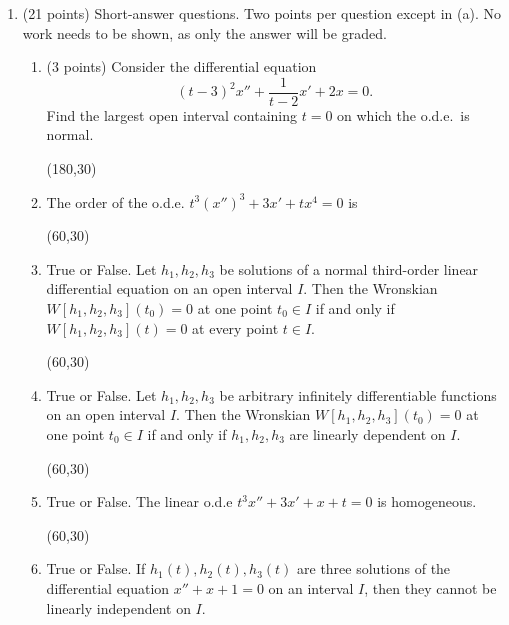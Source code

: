 \documentclass[12pt]{article}
\begin{document}
\begin{enumerate}
 \setlength{\itemsep}{5mm}


\item (21 points) Short-answer questions.  Two points per question
  except in (a).  No work needs to be shown, as only the answer will be graded.

  \begin{enumerate}
    \setlength{\itemsep}{5mm}


    \item (3 points) Consider the differential equation
      \[
        (t-3)^2 x'' + \frac{1}{t-2} x' + 2x = 0.
        \]
        Find the largest open interval containing $t=0$ on which the
        o.d.e.\ is normal.
        
        \hfill \framebox(180,30){}

         \item The order of the o.d.e. $t^3 (x'')^3 + 3x' +tx^4 = 0$ is

      \hfill \framebox(60,30){}


        \item  True or False.  Let $h_1, h_2, h_3$ be solutions of a normal
          third-order linear differential equation on an open
      interval $I$.  Then the Wronskian $W[h_1, h_2, h_3](t_0) = 0$
      at one point $t_0 \in I$ if and only if $W[h_1, h_2, h_3](t)
      =0$ at every point $t \in I$.

      \hfill \framebox(60,30){}

      \item True or False.  Let $h_1, h_2, h_3$ be arbitrary infinitely differentiable
        functions on an open interval $I$.  Then the Wronskian $W[h_1, h_2, h_3](t_0) = 0$
      at one point $t_0 \in I$ if and only if $h_1, h_2, h_3$
      are linearly dependent on $I$.

      \hfill \framebox(60,30){}

           \item True or False.  The linear o.d.e $t^3 x'' + 3x' + x + t
          = 0$ is homogeneous.

          \hfill \framebox(60,30){}

          


            \item True or False.  If $h_1(t), h_2(t), h_3(t)$ are
              three solutions of the differential equation $x'' + x +
              1 = 0$ on an interval $I$, then they cannot be
              linearly independent on $I$.


\end{enumerate}
\end{enumerate}
\end{document}

